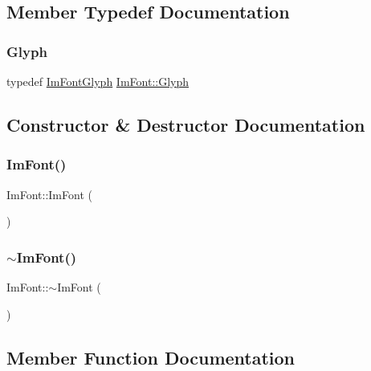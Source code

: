 \subsection{Member Typedef Documentation}
\hypertarget{struct_im_font_a4b802233ac8d3f3beddc395837288683}{}\label{struct_im_font_a4b802233ac8d3f3beddc395837288683} 
\subsubsection{\texorpdfstring{Glyph}{Glyph}}
{\footnotesize\ttfamily typedef \hyperlink{struct_im_font_glyph}{Im\+Font\+Glyph} \hyperlink{struct_im_font_a4b802233ac8d3f3beddc395837288683}{Im\+Font\+::\+Glyph}}



\subsection{Constructor \& Destructor Documentation}
\hypertarget{struct_im_font_a1d35b1eb7c2f6a3a648308531e88e7f1}{}\label{struct_im_font_a1d35b1eb7c2f6a3a648308531e88e7f1} 
\subsubsection{\texorpdfstring{Im\+Font()}{ImFont()}}
{\footnotesize\ttfamily Im\+Font\+::\+Im\+Font (\begin{DoxyParamCaption}{ }\end{DoxyParamCaption})}

\hypertarget{struct_im_font_a377366ed7c5d076363ad4760aeff63ec}{}\label{struct_im_font_a377366ed7c5d076363ad4760aeff63ec} 
\subsubsection{\texorpdfstring{$\sim$\+Im\+Font()}{~ImFont()}}
{\footnotesize\ttfamily Im\+Font\+::$\sim$\+Im\+Font (\begin{DoxyParamCaption}{ }\end{DoxyParamCaption})}



\subsection{Member Function Documentation}
\hypertarget{struct_im_font_ae63d3d343052336d7718aacac8f394b7}{}\label{struct_im_font_ae63d3d343052336d7718aacac8f394b7} 
